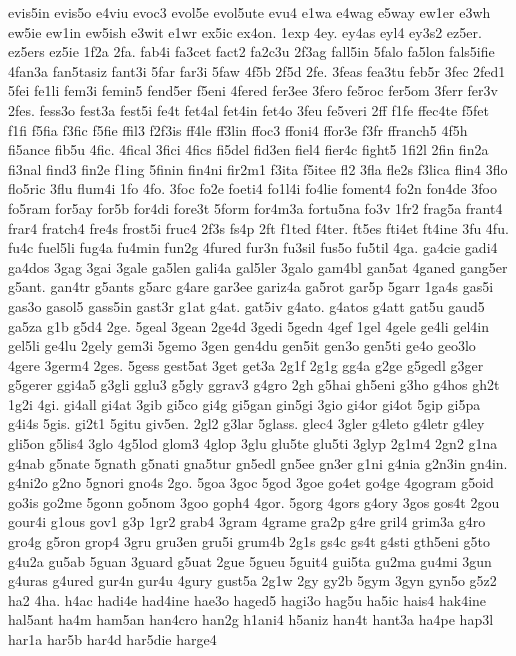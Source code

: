 {evis5in
evis5o
e4viu
evoc3
evol5e
evol5ute
evu4
e1wa
e4wag
e5way
ew1er
e3wh
ew5ie
ew1in
ew5ish
e3wit
e1wr
ex5ic
ex4on.
1exp
4ey.
ey4as
eyl4
ey3s2
ez5er.
ez5ers
ez5ie
1f2a
2fa.
fab4i
fa3cet
fact2
fa2c3u
2f3ag
fall5in
5falo
fa5lon
fals5ifie
4fan3a
fan5tasiz
fant3i
5far
far3i
5faw
4f5b
2f5d
2fe.
3feas
fea3tu
feb5r
3fec
2fed1
5fei
fe1li
fem3i
femin5
fend5er
f5eni
4fered
fer3ee
3fero
fe5roc
fer5om
3ferr
fer3v
2fes.
fess3o
fest3a
fest5i
fe4t
fet4al
fet4in
fet4o
3feu
fe5veri
2ff
f1fe
ffec4te
f5fet
f1fi
f5fia
f3fic
f5fie
ffil3
f2f3is
ff4le
ff3lin
ffoc3
ffoni4
ffor3e
f3fr
ffranch5
4f5h
fi5ance
fib5u
4fic.
4fical
3fici
4fics
fi5del
fid3en
fiel4
fier4c
fight5
1fi2l
2fin
fin2a
fi3nal
find3
fin2e
f1ing
5finin
fin4ni
fir2m1
f3ita
f5itee
fl2
3fla
fle2s
f3lica
flin4
3flo
flo5ric
3flu
flum4i
1fo
4fo.
3foc
fo2e
foeti4
fo1l4i
fo4lie
foment4
fo2n
fon4de
3foo
fo5ram
for5ay
for5b
for4di
fore3t
5form
for4m3a
fortu5na
fo3v
1fr2
frag5a
frant4
frar4
fratch4
fre4s
frost5i
fruc4
2f3s
fs4p
2ft
f1ted
f4ter.
ft5es
fti4et
ft4ine
3fu
4fu.
fu4c
fuel5li
fug4a
fu4min
fun2g
4fured
fur3n
fu3sil
fus5o
fu5til
4ga.
ga4cie
gadi4
ga4dos
3gag
3gai
3gale
ga5len
gali4a
gal5ler
3galo
gam4bl
gan5at
4ganed
gang5er
g5ant.
gan4tr
g5ants
g5arc
g4are
gar3ee
gariz4a
ga5rot
gar5p
5garr
1ga4s
gas5i
gas3o
gasol5
gass5in
gast3r
g1at
g4at.
gat5iv
g4ato.
g4atos
g4att
gat5u
gaud5
ga5za
g1b
g5d4
2ge.
5geal
3gean
2ge4d
3gedi
5gedn
4gef
1gel
4gele
ge4li
gel4in
gel5li
ge4lu
2gely
gem3i
5gemo
3gen
gen4du
gen5it
gen3o
gen5ti
ge4o
geo3lo
4gere
3germ4
2ges.
5gess
gest5at
3get
get3a
2g1f
2g1g
gg4a
g2ge
g5gedl
g3ger
g5gerer
ggi4a5
g3gli
gglu3
g5gly
ggrav3
g4gro
2gh
g5hai
gh5eni
g3ho
g4hos
gh2t
1g2i
4gi.
gi4all
gi4at
3gib
gi5co
gi4g
gi5gan
gin5gi
3gio
gi4or
gi4ot
5gip
gi5pa
g4i4s
5gis.
gi2t1
5gitu
giv5en.
2gl2
g3lar
5glass.
glec4
3gler
g4leto
g4letr
g4ley
gli5on
g5lis4
3glo
4g5lod
glom3
4glop
3glu
glu5te
glu5ti
3glyp
2g1m4
2gn2
g1na
g4nab
g5nate
5gnath
g5nati
gna5tur
gn5edl
gn5ee
gn3er
g1ni
g4nia
g2n3in
gn4in.
g4ni2o
g2no
5gnori
gno4s
2go.
5goa
3goc
5god
3goe
go4et
go4ge
4gogram
g5oid
go3is
go2me
5gonn
go5nom
3goo
goph4
4gor.
5gorg
4gors
g4ory
3gos
gos4t
2gou
gour4i
g1ous
gov1
g3p
1gr2
grab4
3gram
4grame
gra2p
g4re
gril4
grim3a
g4ro
gro4g
g5ron
grop4
3gru
gru3en
gru5i
grum4b
2g1s
gs4c
gs4t
g4sti
gth5eni
g5to
g4u2a
gu5ab
5guan
3guard
g5uat
2gue
5gueu
5guit4
gui5ta
gu2ma
gu4mi
3gun
g4uras
g4ured
gur4n
gur4u
4gury
gust5a
2g1w
2gy
gy2b
5gym
3gyn
gyn5o
g5z2
ha2
4ha.
h4ac
hadi4e
had4ine
hae3o
haged5
hagi3o
hag5u
ha5ic
hais4
hak4ine
hal5ant
ha4m
ham5an
han4cro
han2g
h1ani4
h5aniz
han4t
hant3a
ha4pe
hap3l
har1a
har5b
har4d
har5die
harge4
}
